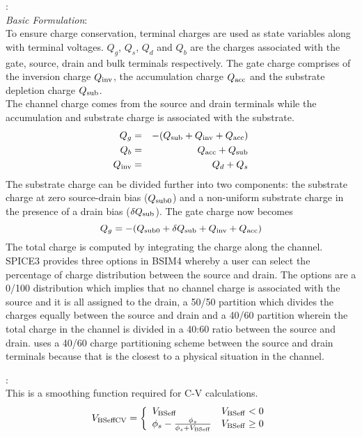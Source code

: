 \documentclass{article}
\begin{document}
:\\
{\it Basic Formulation}:\\
To ensure charge conservation, terminal charges are used as state
variables along with terminal voltages. $Q_g$, $Q_s$, $Q_d$ and
$Q_b$ are the charges associated with the gate, source, drain and
bulk terminals respectively. The gate charge comprises of the
inversion charge $Q_{\rm{inv}}$, the accumulation charge
$Q_{\rm{acc}}$ and the substrate depletion charge $Q_{\rm{sub}}$. \\
\indent The channel charge comes from the source and drain
terminals while the accumulation and substrate charge is
associated with the substrate.
\begin{eqnarray}
Q_g & = & -(Q_{\rm{sub}} + Q_{\rm{inv}} + Q_{\rm{acc}}) \nonumber \\
Q_b & = & Q_{\rm{acc}} + Q_{\rm{sub}} \nonumber \\
Q_{\rm{inv}} & = & Q_d + Q_s
\end{eqnarray}
The substrate charge can be divided further into two components:
the substrate charge at zero source-drain bias ($Q_{\rm{sub0}}$)
and a non-uniform substrate charge in the presence of a drain bias
($\delta Q_{\rm{sub}}$). The gate charge now becomes
\begin{equation}
Q_g = -(Q_{\rm{sub0}} + \delta Q_{\rm{sub}} + Q_{\rm{inv}} +
Q_{\rm{acc}})
\end{equation}
The total charge is computed by integrating the charge along the
channel. SPICE3 provides three options in BSIM4 whereby a user can
select the percentage of charge distribution between the source
and drain. The options are a 0/100 distribution which implies that
no channel charge is associated with the source and it is all
assigned to the drain, a 50/50 partition which divides the charges
equally between the source and drain and a 40/60 partition wherein
the total charge in the channel is divided in a 40:60 ratio
between the source and drain. \FDA uses a 40/60 charge
partitioning scheme between the source and drain terminals because
that is the closest to a physical situation in the channel.

:\\
This is a smoothing function required for C-V calculations.
\begin{equation}
V_{\rm{BSeffCV}} = \left\{\begin{array}{ll}
       V_{\rm{BSeff}} &  V_{\rm{BSeff}} < 0 \nonumber \\
       \phi_s - {\phi_s \over \phi_s + V_{\rm{BSeff}}} & V_{\rm{BSeff}} \geq 0
                            \end{array}
                    \right.
\end{equation}
\end{document}
